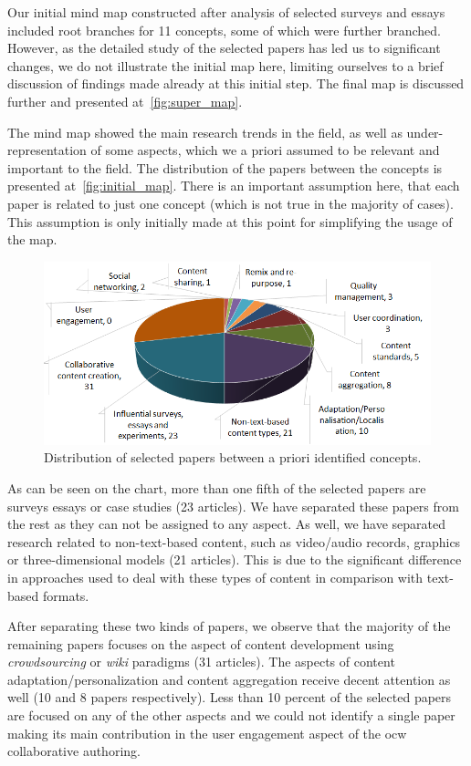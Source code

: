 \documentclass[PhD, Submit, ngerman,UKenglish,table]{scrbook}
\begin{document}
Our initial mind map constructed after analysis of selected surveys and essays included root branches for 11 concepts, some of which were further branched.
However, as the detailed study of the selected papers has led us to significant changes, we do not illustrate the initial map here, limiting ourselves to a brief discussion of findings made already at this initial step.
The final map is discussed further and presented at~\autoref{fig:super_map}.

The mind map showed the main research trends in the field, as well as under-representation of some aspects, which we a priori assumed to be relevant and important to the field.
The distribution of the papers between the concepts is presented at~\autoref{fig:initial_map}. 
There is an important assumption here, that each paper is related to just one concept (which is not true in the majority of cases).
This assumption is only initially made at this point for simplifying the usage of the map.


\begin{figure}[!ht]
  \centering
  \includegraphics[width=\textwidth]{images/initial_map.png}
  \caption{Distribution of selected papers between a priori identified concepts.}
  \label{fig:initial_map}
\end{figure}

As can be seen on the chart, more than one fifth of the selected papers are surveys essays or case studies (23 articles).
We have separated these papers from the rest as they can not be assigned to any aspect.
As well, we have separated research related to non-text-based content, such as video/audio records, graphics or three-dimensional models (21 articles).
This is due to the significant difference in approaches used to deal with these types of content in comparison with text-based formats.

After separating these two kinds of papers, we observe that the majority of the remaining papers focuses on the aspect of content development using \emph{crowdsourcing} or \emph{wiki} paradigms (31 articles).
The aspects of content adaptation/personalization and content aggregation receive decent attention as well (10 and 8 papers respectively).
Less than 10 percent of the selected papers are focused on any of the other aspects and we could not identify a single paper making its main contribution in the user engagement aspect of the \gls{ocw} collaborative authoring.
\end{document}
